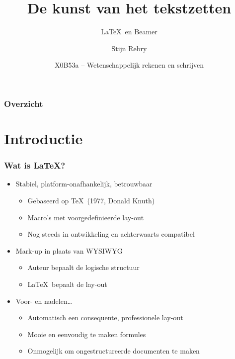 \documentclass[kulak,handout,sedes]{kulakbeamer} %
\title[\LaTeX\ en Beamer]{De kunst van het tekstzetten}
\subtitle{\LaTeX\ en Beamer}
\author{Stijn Rebry}
\institute[Kulak]{Groep Wetenschap \& Technologie, Kulak}
\date{X0B53a -- Wetenschappelijk rekenen en schrijven}
\begin{document}
\begin{titleframe}
	\titlepage
\end{titleframe}

\begin{outlineframe}\frametitle{Overzicht}
	\tableofcontents[hideallsubsections]
\end{outlineframe}

\section{Introductie}

\begin{frame}[t]
	\frametitle{Wat is LaTeX?}
	\begin{itemize}
		\item Stabiel, platform-onafhankelijk, betrouwbaar
		      \begin{itemize}
			      \item Gebaseerd op \TeX\ (1977, Donald Knuth)
			      \item Macro's met voorgedefinieerde lay-out
			      \item Nog steeds in ontwikkeling en achterwaarts compatibel
		      \end{itemize}
		\item Mark-up in plaats van WYSIWYG
		      \begin{itemize}
			      \item Auteur bepaalt de logische structuur
			      \item \LaTeX\ bepaalt de lay-out
		      \end{itemize}
		\item Voor- en nadelen\ldots
		      \begin{itemize}
			      \item Automatisch een consequente, professionele lay-out
			      \item Mooie en eenvoudig te maken formules
			      \item Onmogelijk om ongestructureerde documenten te maken
		      \end{itemize}
	\end{itemize}
\end{frame}

\end{document}
